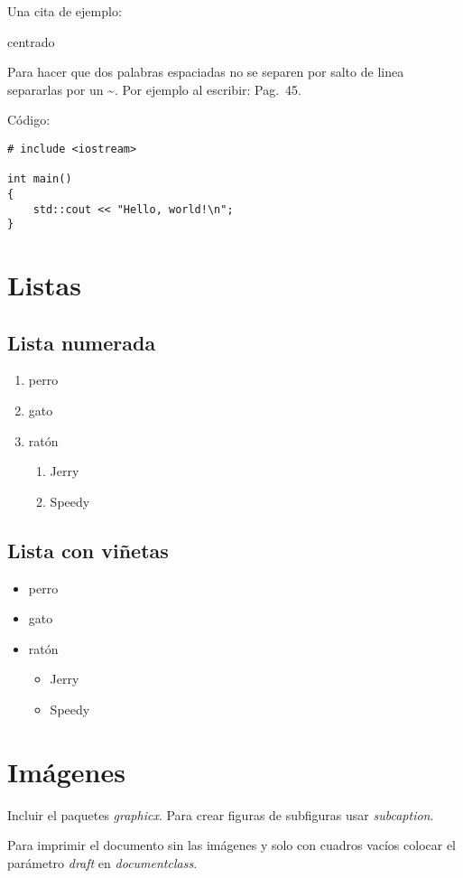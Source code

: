 \documentclass[12pt, a4paper,twoside]{article} %
\begin{document}
Una cita de ejemplo: \cite{texbook}

\begin{center}
centrado %
\end{center}

Para hacer que dos palabras espaciadas no se separen por salto de linea separarlas por un \textasciitilde{}. Por ejemplo al escribir:  Pag.~45.

Código:
\begin{lstlisting}
# include <iostream>
 
int main()
{
	std::cout << "Hello, world!\n";
}
\end{lstlisting}

\section{Listas}
\subsection{Lista numerada}
\begin{enumerate}
\item perro
\item gato
\item ratón
	\begin{enumerate}
	\item Jerry
	\item Speedy
	\end{enumerate}
\end{enumerate}
\subsection{Lista con viñetas}
\begin{itemize}
\item perro
\item gato
\item ratón
	\begin{itemize}
	\item Jerry
	\item Speedy
	\end{itemize}
\end{itemize}

\section{Imágenes}
Incluir el paquetes \emph{graphicx}. Para crear figuras de subfiguras usar \emph{subcaption}. 

Para imprimir el documento sin las imágenes y solo con cuadros vacíos colocar el parámetro \emph{draft} en \emph{documentclass}. 
\end{document}
